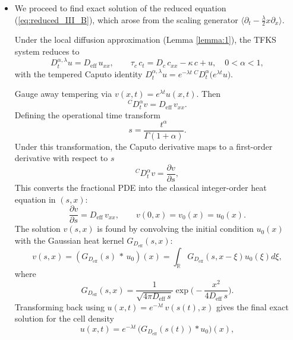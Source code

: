 \documentclass{article}
\begin{document}
\begin{description}
\begin{itemize}
\item[\textbf{III.B)}]
We proceed to find exact solution of the reduced equation (\ref{eq:reduced_III_B}), which arose from the scaling generator $\langle\partial_{t} - \frac{\lambda}{2}x\partial_{x}\rangle$.
\par 

Under the local diffusion approximation (Lemma \ref{lemma:1}), the TFKS system reduces to
\begin{equation*}
D^{\alpha,\lambda}_t u = D_{\mathrm{eff}}\,u_{xx},\qquad 
\tau_c\,c_t = D_c\,c_{xx}-\kappa\,c + u,
\quad 0<\alpha< 1,
\end{equation*}
with the tempered Caputo identity $D^{\alpha,\lambda}_t u = e^{-\lambda t} \,{}^C\!D_t^\alpha\!\big(e^{\lambda t}u\big)$.
\par 
Gauge away tempering via $v(x,t)=e^{\lambda t}u(x,t)$. Then
\begin{equation*}
{}^C\!D_t^\alpha v=D_{\mathrm{eff}}\,v_{xx}.
\end{equation*}
Defining the operational time transform
\begin{equation*}
s=\frac{t^\alpha}{\Gamma(1+\alpha)}.
\end{equation*}
Under this transformation, the Caputo derivative maps to a first-order derivative with respect to $s$
\begin{equation*}
{}^C\!D_t^\alpha v=\frac{\partial v}{\partial s},
\end{equation*}
This converts the fractional PDE into the classical integer-order heat equation in $(s,x)$:
\begin{equation*}
\frac{\partial v}{\partial s}=D_\mathrm{eff}\, v_{xx},\qquad v(0,x)=v_0(x)=u_0(x).
\end{equation*}
The solution $v(s,x)$ is found by convolving the initial condition $u_0(x)$ with the Gaussian heat kernel $G_{D_\mathrm{eff}}(s,x)$:
\begin{equation*}
v(s,x)=(G_{D_\mathrm{eff}}(s)\,*\, u_0)(x)=\int_\mathbb{R} G_{D_\mathrm{eff}} (s,x-\xi)u_0(\xi)d\xi,
\end{equation*}
where
\begin{equation*}
G_{D_{\mathrm{eff}}}(s,x)=\frac{1}{\sqrt{4\pi D_{\mathrm{eff}}\, s}}\exp\!\Big(-\frac{x^2}{4D_{\mathrm{eff}}\,s}\Big).
\end{equation*}
Transforming back using $u(x,t)=e^{-\lambda t}\,v(s(t),x)$ gives the final exact solution for the cell density
\begin{equation*}\label{eq:IIIB_u}
u(x,t)=e^{-\lambda t}\,\big(G_{D_{\mathrm{eff}}}(s(t))\!*u_0\big)(x),

\end{equation*}
\end{itemize}
\end{description}
\end{document}
